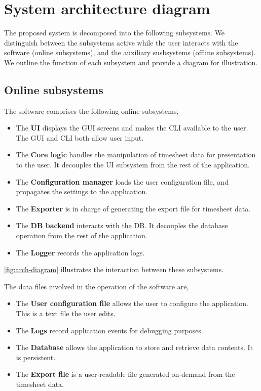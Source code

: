 \section{System architecture diagram} \label{sec:system-diagram}
The proposed system is decomposed into the following subsystems. We distinguish
between the subsystems active while the user interacts with the software (online
subsystems), and the auxiliary susbsystems (offline subsystems). We outline
the function of each subsystem and provide a diagram for illustration.

\subsection{Online subsystems}
The software comprises the following online subsystems,
\begin{itemize}
\item The \textbf{\gls{UI}} displays the \gls{GUI} screens and makes the
  \gls{CLI} available to the user. The \gls{GUI} and \gls{CLI} both allow
  user input.
\item The \textbf{Core logic} handles the manipulation of timesheet data for
  presentation to the user. It decouples the \gls{UI} subsystem from the rest
  of the application.
\item The \textbf{Configuration manager} loads the user configuration file, and
  propagates the settings to the application.
\item The \textbf{Exporter} is in charge of generating the export file
  for timesheet data.
\item The \textbf{\gls{DB} backend} interacts with the \gls{DB}. It decouples
  the database operation from the rest of the application.
\item The \textbf{Logger} records the application logs.
\end{itemize}

\cref{fig:arch-diagram} illustrates the interaction between these
subsystems.

The data files involved in the operation of the software are,
\begin{itemize}
\item The \textbf{User configuration file} allows the user to configure the
  application. This is a text file the user edits.
\item The \textbf{Logs} record application events for debugging purposes.
\item The \textbf{Database} allows the application to store and retrieve
  data contents. It is persistent.
\item The \textbf{Export file} is a user-readable file generated on-demand
  from the timesheet data.
\end{itemize}

